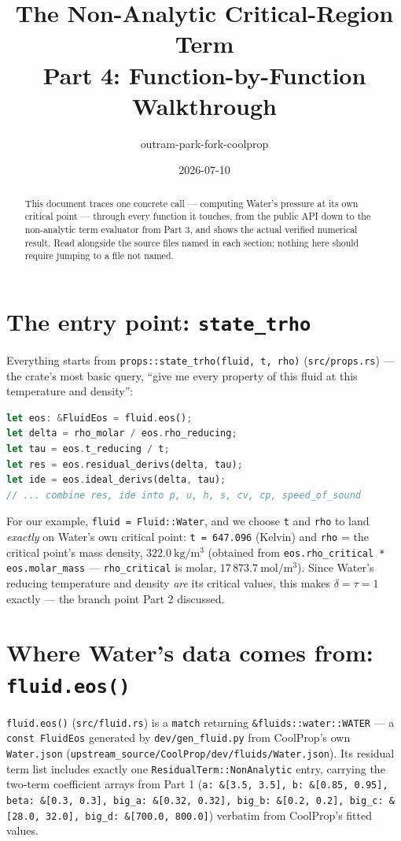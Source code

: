 \documentclass[11pt]{article}
\title{The Non-Analytic Critical-Region Term \\ \large Part 4: Function-by-Function Walkthrough}
\author{outram-park-fork-coolprop}
\date{2026-07-10}
\begin{document}
\maketitle

\begin{abstract}
This document traces one concrete call — computing Water's pressure at its
own critical point — through every function it touches, from the public API
down to the non-analytic term evaluator from Part 3, and shows the actual
verified numerical result. Read alongside the source files named in each
section; nothing here should require jumping to a file not named.
\end{abstract}

\section{The entry point: \texttt{state\_trho}}

Everything starts from \texttt{props::state\_trho(fluid, t, rho)}
(\texttt{src/props.rs}) — the crate's most basic query, ``give me every
property of this fluid at this temperature and density'':
\begin{lstlisting}[language=Rust]
let eos: &FluidEos = fluid.eos();
let delta = rho_molar / eos.rho_reducing;
let tau = eos.t_reducing / t;
let res = eos.residual_derivs(delta, tau);
let ide = eos.ideal_derivs(delta, tau);
// ... combine res, ide into p, u, h, s, cv, cp, speed_of_sound
\end{lstlisting}
For our example, \texttt{fluid = Fluid::Water}, and we choose \texttt{t}
and \texttt{rho} to land \emph{exactly} on Water's own critical point:
\texttt{t = 647.096} (Kelvin) and \texttt{rho} = the critical point's mass
density, $322.0\ \mathrm{kg/m^3}$ (obtained from
\texttt{eos.rho\_critical * eos.molar\_mass} — \texttt{rho\_critical} is
molar, $17\,873.7\ \mathrm{mol/m^3}$). Since Water's reducing temperature
and density \emph{are} its critical values, this makes $\delta = \tau = 1$
exactly — the branch point Part 2 discussed.

\section{Where Water's data comes from: \texttt{fluid.eos()}}

\texttt{fluid.eos()} (\texttt{src/fluid.rs}) is a \texttt{match} returning
\texttt{\&fluids::water::WATER} — a \texttt{const FluidEos} generated by
\texttt{dev/gen\_fluid.py} from CoolProp's own \texttt{Water.json}
(\texttt{upstream\_source/CoolProp/dev/fluids/Water.json}). Its residual
term list includes exactly one \texttt{ResidualTerm::NonAnalytic} entry,
carrying the two-term coefficient arrays from Part 1
(\texttt{a: \&[3.5, 3.5], b: \&[0.85, 0.95], beta: \&[0.3, 0.3], big\_a:
\&[0.32, 0.32], big\_b: \&[0.2, 0.2], big\_c: \&[28.0, 32.0], big\_d:
\&[700.0, 800.0]}) verbatim from CoolProp's fitted values.
\end{document}
